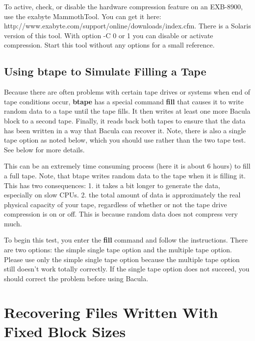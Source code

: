 To active, check, or disable the hardware compression feature
on an EXB-8900, use the exabyte MammothTool. You can get it here:
{http://www.exabyte.com/support/online/downloads/index.cfm}.
There is a Solaris version of this tool. With option -C 0 or 1 you
can disable or activate compression. Start this tool without any
options for a small reference.

\label{fill}
\subsection{Using btape to Simulate Filling a Tape}

Because there are often problems with certain tape drives or systems when end
of tape conditions occur, {\bf btape} has a special command {\bf fill} that
causes it to write random data to a tape until the tape fills. It then writes
at least one more Bacula block to a second tape. Finally, it reads back both
tapes to ensure that the data has been written in a way that Bacula can
recover it. Note, there is also a single tape option as noted below, which you
should use rather than the two tape test. See below for more details.

This can be an extremely time consuming process (here it is about 6 hours) to
fill a full tape. Note, that btape writes random data to the tape when it is
filling it. This has two consequences: 1. it takes a bit longer to generate
the data, especially on slow CPUs. 2. the total amount of data is
approximately the real physical capacity of your tape, regardless of whether
or not the tape drive compression is on or off. This is because random data
does not compress very much.

To begin this test, you enter the {\bf fill} command and follow the
instructions. There are two options: the simple single tape option and the
multiple tape option. Please use only the simple single tape option because
the multiple tape option still doesn't work totally correctly. If the single
tape option does not succeed, you should correct the problem before using
Bacula.
\label{RecoveringFiles}

\section{Recovering Files Written With Fixed Block Sizes}


